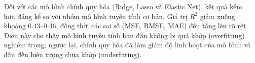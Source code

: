 Đối với các mô hình chính quy hóa (Ridge, Lasso và Elastic Net), kết quả kém
hơn đáng kể so với nhóm mô hình tuyến tính cơ bản. Giá trị $R^2$ giảm xuống
khoảng 0.43--0.46, đồng thời các sai số (MSE, RMSE, MAE) đều tăng lên rõ rệt.
Điều này cho thấy mô hình tuyến tính ban đầu không bị quá khớp (overfitting)
nghiêm trọng; ngược lại, chính quy hóa đã làm giảm độ linh hoạt của mô hình và
dẫn đến hiện tượng chưa khớp (underfitting).

